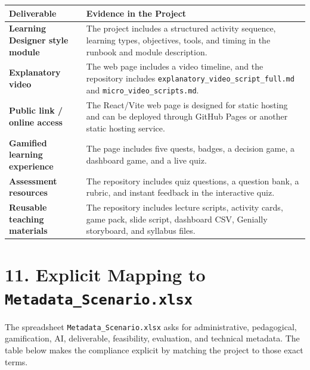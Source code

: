 \documentclass[11pt,a4paper]{article}
\begin{document}
\begin{longtable}{>{\bfseries}p{4.5cm}p{10cm}}
\textbf{Deliverable} & \textbf{Evidence in the Project} \\
\hline
Learning Designer style module & The project includes a structured activity sequence, learning types, objectives, tools, and timing in the runbook and module description. \\
Explanatory video & The web page includes a video timeline, and the repository includes \texttt{explanatory\_video\_script\_full.md} and \texttt{micro\_video\_scripts.md}. \\
Public link / online access & The React/Vite web page is designed for static hosting and can be deployed through GitHub Pages or another static hosting service. \\
Gamified learning experience & The page includes five quests, badges, a decision game, a dashboard game, and a live quiz. \\
Assessment resources & The repository includes quiz questions, a question bank, a rubric, and instant feedback in the interactive quiz. \\
Reusable teaching materials & The repository includes lecture scripts, activity cards, game pack, slide script, dashboard CSV, Genially storyboard, and syllabus files. \\
\end{longtable}

\section*{11. Explicit Mapping to \texttt{Metadata\_Scenario.xlsx}}

The spreadsheet \texttt{Metadata\_Scenario.xlsx} asks for administrative, pedagogical, gamification, AI, deliverable, feasibility, evaluation, and technical metadata. The table below makes the compliance explicit by matching the project to those exact terms.
\end{document}
